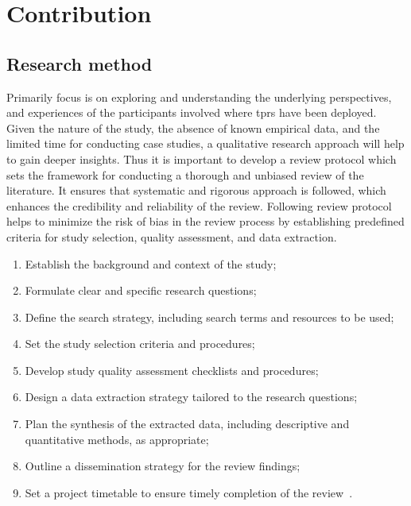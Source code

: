 
\newpage


\section{Contribution}\label{sec:contribution}


\subsection{Research method}\label{subsec:research-method}

Primarily focus is on exploring and understanding the underlying perspectives, and experiences of the participants involved where \ac{tprs} have been deployed. Given
the nature of the study, the absence of known empirical data, and the limited time for conducting case studies, a qualitative research
approach
will help to gain deeper insights. Thus it is important to develop a review protocol which sets the framework for conducting a thorough and
unbiased review of the literature. It ensures that
systematic and rigorous approach is followed, which enhances the credibility and reliability of the review. Following review protocol helps
to minimize the risk of bias in the review process by establishing predefined criteria for study selection, quality assessment, and data
extraction.

\begin{enumerate}
  \item Establish the background and context of the study;
  \item Formulate clear and specific research questions;
  \item Define the search strategy, including search terms and resources to be used;
  \item Set the study selection criteria and procedures;
  \item Develop study quality assessment checklists and procedures;
  \item Design a data extraction strategy tailored to the research questions;
  \item Plan the synthesis of the extracted data, including descriptive and quantitative methods, as appropriate;
  \item Outline a dissemination strategy for the review findings;
  \item Set a project timetable to ensure timely completion of the review~\cite[4-5]{systematic_review_2004}.
\end{enumerate}

